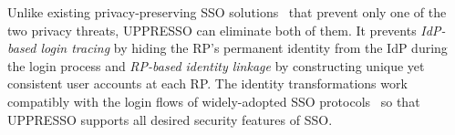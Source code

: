 Unlike existing privacy-preserving SSO solutions~\cite{BrowserID,SPRESSO,NIST2017draft} that prevent only one of the two privacy threats, 
UPPRESSO can eliminate both of them. 
It prevents {\em IdP-based login tracing} by hiding the RP's permanent identity from the IdP %
during the login process and {\em RP-based identity linkage} by constructing unique yet consistent user accounts at each RP.
The identity transformations work compatibly with the login flows of widely-adopted SSO protocols~\cite{OpenIDConnect,rfc6749,SAML,NIST2017draft} so that UPPRESSO supports all desired security features of SSO. %
%
%

